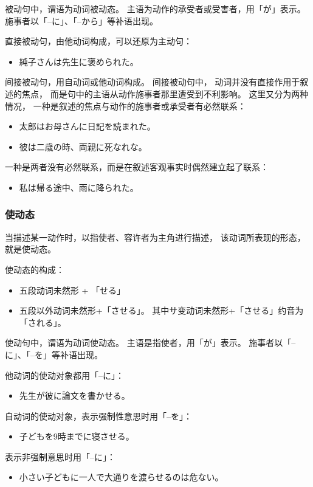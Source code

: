 被动句中，谓语为动词被动态。
主语为动作的承受者或受害者，用「が」表示。
施事者以「--に」、「--から」等补语出现。

直接被动句，由他动词构成，可以还原为主动句：
\begin{itemize}
  \item 純子さんは先生に褒められた。
\end{itemize}

间接被动句，用自动词或他动词构成。
间接被动句中，
动词并没有直接作用于叙述的焦点，
而是句中的主语从动作施事者那里遭受到不利影响。
这里又分为两种情况，
一种是叙述的焦点与动作的施事者或承受者有必然联系：
\begin{itemize}
  \item 太郎はお母さんに日記を読まれた。
  \item 彼は二歳の時、両親に死なれな。
\end{itemize}
一种是两者没有必然联系，而是在叙述客观事实时偶然建立起了联系：
\begin{itemize}
  \item 私は帰る途中、雨に降られた。
\end{itemize}


\subsubsection{使动态}%

当描述某一动作时，以指使者、容许者为主角进行描述，
该动词所表现的形态，就是使动态。

使动态的构成：
\begin{itemize}
  \item 五段动词未然形 \cn[1] + 「せる」
  \item 五段以外动词未然形+「させる」。
    其中サ变动词未然形+「させる」约音为「される」。
\end{itemize}

使动句中，谓语为动词使动态。
主语是指使者，用「が」表示。
施事者以「--に」、「--を」等补语出现。

他动词的使动对象都用「--に」：
\begin{itemize}
  \item 先生が彼に論文を書かせる。
\end{itemize}

自动词的使动对象，表示强制性意思时用「--を」：
\begin{itemize}
  \item 子どもを9時までに寝させる。
\end{itemize}
表示非强制意思时用「--に」：
\begin{itemize}
  \item 小さい子どもに一人で大通りを渡らせるのは危ない。
\end{itemize}

